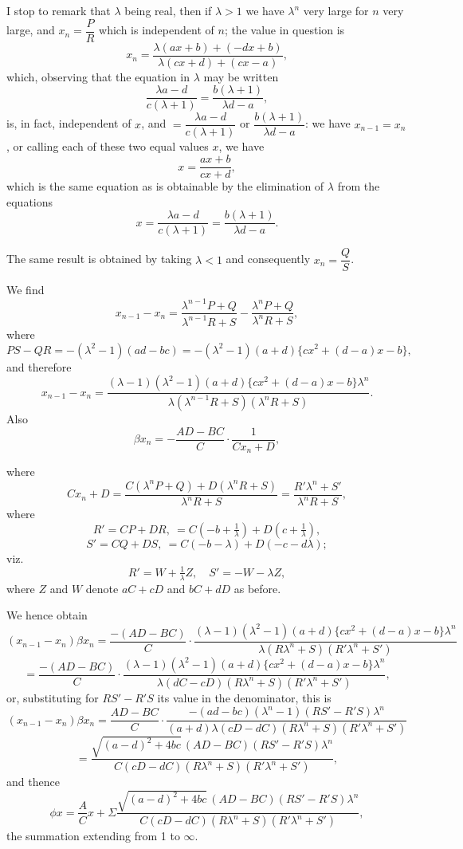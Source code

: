 \documentclass[11pt,a4paper]{article}
\begin{document}
\medskip

I stop to remark that $\lambda$ being real, then if $\lambda > 1$ we have $\lambda^{n}$ very large for $n$ very large, and $x_{n} = \dfrac{P}{R}$ which is independent of $n$; the value in question is
\[
x_{n} = \frac{\lambda(ax + b) + (-dx + b)}{\lambda(cx + d) + (cx - a)},
\]
which, observing that the equation in $\lambda$ may be written
\[
\frac{\lambda a - d}{c(\lambda + 1)} = \frac{b(\lambda + 1)}{\lambda d - a},
\]
is, in fact, independent of $x$, and $= \dfrac{\lambda a - d}{c(\lambda + 1)}$ or $\dfrac{b(\lambda + 1)}{\lambda d - a}$: we have $x_{n-1} = x_{n}$, or calling each of these two equal values $x$, we have
\[
x = \frac{ax + b}{cx + d},
\]
which is the same equation as is obtainable by the elimination of $\lambda$ from the equations
\[
x = \frac{\lambda a - d}{c(\lambda + 1)} = \frac{b(\lambda + 1)}{\lambda d - a}.
\]

The same result is obtained by taking $\lambda < 1$ and consequently $x_{n} = \dfrac{Q}{S}$.

\medskip

We find
\[
x_{n-1} - x_{n} = \frac{\lambda^{n-1}P + Q}{\lambda^{n-1}R + S} - \frac{\lambda^{n}P + Q}{\lambda^{n}R + S},
\]
where
\[
PS - QR = -(\lambda^{2} - 1)(ad - bc) = -(\lambda^{2} - 1)(a + d)\{cx^{2} + (d - a)x - b\},
\]
and therefore
\[
x_{n-1} - x_{n} = \frac{(\lambda - 1)(\lambda^{2} - 1)(a + d)\{cx^{2} + (d - a)x - b\}\lambda^{n}}{\lambda(\lambda^{n-1}R + S)(\lambda^{n}R + S)}.
\]
Also
\[
\beta x_{n} = -\frac{AD - BC}{C}\cdot\frac{1}{Cx_{n} + D},
\]

\newpage


where
\[
Cx_{n} + D = \frac{C(\lambda^{n}P + Q) + D(\lambda^{n}R + S)}{\lambda^{n}R + S} = \frac{R'\lambda^{n} + S'}{\lambda^{n}R + S},
\]
where
\[
R' = CP + DR,\ = C\left(-b + \tfrac{1}{\lambda}\right) + D\left(c + \tfrac{1}{\lambda}\right),
\]
\[
S' = CQ + DS,\ = C(-b - \lambda) + D(-c - d\lambda);
\]
viz.
\[
R' = W + \tfrac{1}{\lambda}Z,\quad S' = -W - \lambda Z,
\]
where $Z$ and $W$ denote $aC + cD$ and $bC + dD$ as before.

\medskip

We hence obtain
\[
(x_{n-1} - x_{n})\beta x_{n} = \frac{-(AD - BC)}{C}\cdot\frac{(\lambda - 1)(\lambda^{2} - 1)(a + d)\{cx^{2} + (d - a)x - b\}\lambda^{n}}{\lambda(R\lambda^{n} + S)(R'\lambda^{n} + S')}
\]
\[
= \frac{-(AD - BC)}{C}\cdot\frac{(\lambda - 1)(\lambda^{2} - 1)(a + d)\{cx^{2} + (d - a)x - b\}\lambda^{n}}{\lambda(dC - cD)(R\lambda^{n} + S)(R'\lambda^{n} + S')},
\]
or, substituting for $RS' - R'S$ its value in the denominator, this is
\[
(x_{n-1} - x_{n})\beta x_{n} = \frac{AD - BC}{C}\cdot\frac{-(ad - bc)(\lambda^{n} - 1)(RS' - R'S)\lambda^{n}}{(a + d)\lambda(cD - dC)(R\lambda^{n} + S)(R'\lambda^{n} + S')}
\]
\[
= \frac{\sqrt{(a - d)^{2} + 4bc}\,(AD - BC)(RS' - R'S)\lambda^{n}}{C(cD - dC)(R\lambda^{n} + S)(R'\lambda^{n} + S')},
\]
and thence
\[
\phi x = \frac{A}{C}x + \Sigma\frac{\sqrt{(a - d)^{2} + 4bc}\,(AD - BC)(RS' - R'S)\lambda^{n}}{C(cD - dC)(R\lambda^{n} + S)(R'\lambda^{n} + S')},
\]
the summation extending from 1 to $\infty$.
\end{document}
